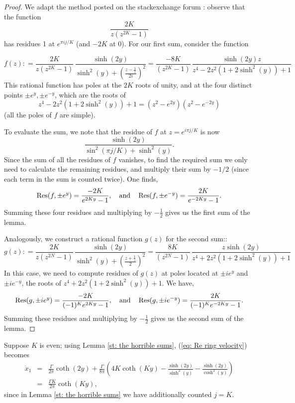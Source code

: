 \documentclass[11pt,twoside]{article}
\theoremstyle{definition}
\numberwithin{equation}{section}
\begin{document}
\begin{proof}
We adapt the method posted on the stackexchange forum \cite{2661896}: observe that the function \[
\frac{2K}{z(z^{2K} -1)} 
\]
has residues 1 at $e^{\pi ij/K}$ (and $-2K$ at 0).  For our first sum, consider the function

\begin{equation}
    \label{eq: the sum but function}
    f(z): = \frac{2K}{z(z^{2K} -1)}\, \frac{\sinh(2y)}{\sinh^2(y) + \left(\frac{z - \frac{1}{z}}{2i}\right)^2} = \frac{-8K}{(z^{2K} -1)} \, \frac{\sinh(2y)z}{z^4 - 2z^2(1 + 2\sinh^2(y)) + 1}
\end{equation}
This rational function has poles at the $2K$ roots of unity, and at the four distinct points $\pm e^y, \pm e^{-y}$, which are the roots of 
$$z^4 - 2z^2(1 + 2\sinh^2(y)) + 1 = (z^2-e^{2y})(z^2-e^{-2y})$$ 
(all the poles of $f$ are simple). 

To evaluate the sum, we note that the residue of $f$ at $z=e^{i\pi j/K}$ is now 
$$\frac{\sinh(2y)}{\sin^2(\pi j/K)+\sinh^2(y)}.$$ 
Since the sum of all the residues of $f$ vanishes, to find the required sum we only need to calculate the remaining residues, and multiply their sum by $-1/2$ (since each term in the sum is counted twice). One finds,
$$\mathop\mathrm{Res}(f,\pm e^y) =\frac{-2K}{e^{2Ky} - 1},\quad\text{and}\quad 
\mathop\mathrm{Res}(f,\pm e^{-y}) =\frac{2K}{e^{-2Ky} - 1}.$$
Summing these four residues and multiplying by $-\frac{1}{2}$ gives us the first sum of the lemma.

Analogously, we construct a rational function $g(z)$ for the second sum::
\[
g(z): = \frac{2K}{z(z^{2N} -1)}\,\frac{\sinh(2y)}{\sinh^2(y) + \left(\frac{z + \frac{1}{z}}{2}\right)^2} = \frac{8K}{(z^{2N} -1)}\,\frac{z\sinh(2y)}{z^4 + 2z^2(1 + 2\sinh^2(y)) + 1}
\]
In this case, we need to compute residues of $g(z)$ at poles located at $\pm i e^y$ and $\pm ie^{-y}$, the roots of $z^4 + 2z^2(1 + 2\sinh^2(y)) + 1$. We have, 
$$\mathop\mathrm{Res}(g,\pm ie^y) =\frac{-2K}{(-1)^Ke^{2Ky} - 1},\quad\text{and}\quad 
\mathop\mathrm{Res}(g,\pm ie^{-y}) =\frac{2K}{(-1)^Ke^{-2Ky} - 1}.$$
Summing these residues and multiplying by $-\frac{1}{2}$ gives us the second sum of the lemma.
\end{proof}

Suppose $K$ is even; using Lemma \ref{st: the horrible sums},
(\ref{eq: Re ring velocity}) becomes 
\begin{equation}
\label{eq: ring Re final formula velocity}
\begin{array}{rcl}
\dot{x}_1 &=& \frac{\Gamma}{2\pi}\coth(2y) + \frac{\Gamma }{8\pi}\left(4K\coth(Ky)  - \frac{\sinh(2y)}{\sinh^2(y)}  - \frac{\sinh(2y)}{\cosh^2(y)}\right)  \\[4pt]
&=& \frac{\Gamma K}{2\pi} \coth(Ky),
\end{array}
\end{equation}
since in Lemma \ref{st: the horrible sums} we have additionally counted $j=K$. 
\end{document}
